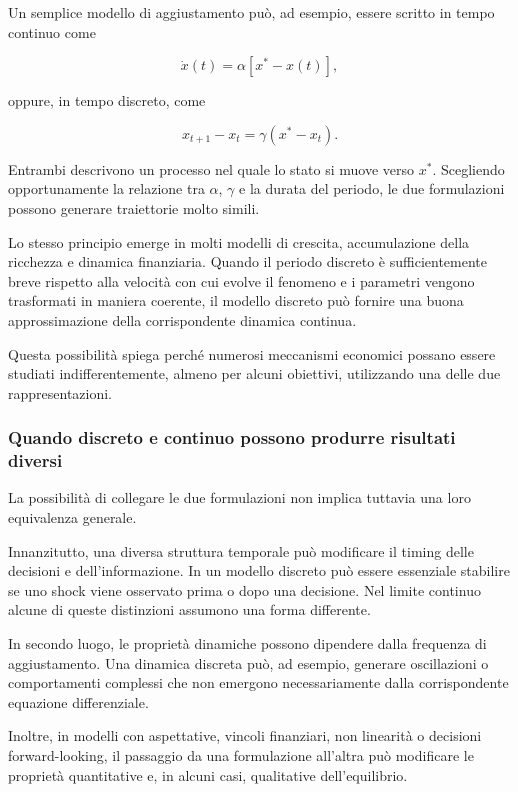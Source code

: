 \documentclass{book}
\begin{document}
Un semplice modello di aggiustamento può, ad esempio, essere scritto in tempo continuo come

$$
\dot x(t)=\alpha\left[x^*-x(t)\right],
$$

oppure, in tempo discreto, come

$$
x_{t+1}-x_t
=
\gamma\left(x^*-x_t\right).
$$

Entrambi descrivono un processo nel quale lo stato si muove verso $x^*$. Scegliendo opportunamente la relazione tra $\alpha$, $\gamma$ e la durata del periodo, le due formulazioni possono generare traiettorie molto simili.

Lo stesso principio emerge in molti modelli di crescita, accumulazione della ricchezza e dinamica finanziaria. Quando il periodo discreto è sufficientemente breve rispetto alla velocità con cui evolve il fenomeno e i parametri vengono trasformati in maniera coerente, il modello discreto può fornire una buona approssimazione della corrispondente dinamica continua.

Questa possibilità spiega perché numerosi meccanismi economici possano essere studiati indifferentemente, almeno per alcuni obiettivi, utilizzando una delle due rappresentazioni.

\subsubsection{Quando discreto e continuo possono produrre risultati diversi}

La possibilità di collegare le due formulazioni non implica tuttavia una loro equivalenza generale.

Innanzitutto, una diversa struttura temporale può modificare il timing delle decisioni e dell'informazione. In un modello discreto può essere essenziale stabilire se uno shock viene osservato prima o dopo una decisione. Nel limite continuo alcune di queste distinzioni assumono una forma differente.

In secondo luogo, le proprietà dinamiche possono dipendere dalla frequenza di aggiustamento. Una dinamica discreta può, ad esempio, generare oscillazioni o comportamenti complessi che non emergono necessariamente dalla corrispondente equazione differenziale.

Inoltre, in modelli con aspettative, vincoli finanziari, non linearità o decisioni forward-looking, il passaggio da una formulazione all'altra può modificare le proprietà quantitative e, in alcuni casi, qualitative dell'equilibrio.
\end{document}
